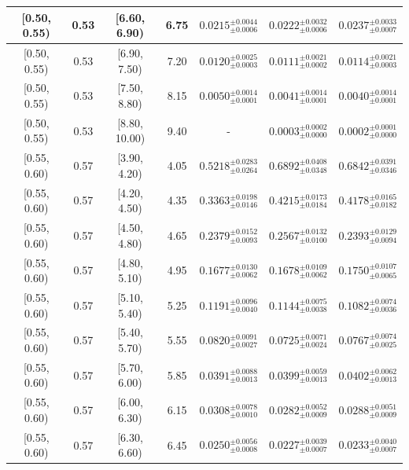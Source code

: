 \begin{longtable}{|c|c|c|c|c|c|c|}
\hline
[0.50, 0.55) & 0.53 & [6.60, 6.90) & 6.75 & $0.0215^{ \pm 0.0044 }_{ \pm 0.0006 }$ & $0.0222^{ \pm 0.0032 }_{ \pm 0.0006 }$ & $0.0237^{ \pm 0.0033 }_{ \pm 0.0007 }$ \\ 
\hline
[0.50, 0.55) & 0.53 & [6.90, 7.50) & 7.20 & $0.0120^{ \pm 0.0025 }_{ \pm 0.0003 }$ & $0.0111^{ \pm 0.0021 }_{ \pm 0.0002 }$ & $0.0114^{ \pm 0.0021 }_{ \pm 0.0003 }$ \\ 
\hline
[0.50, 0.55) & 0.53 & [7.50, 8.80) & 8.15 & $0.0050^{ \pm 0.0014 }_{ \pm 0.0001 }$ & $0.0041^{ \pm 0.0014 }_{ \pm 0.0001 }$ & $0.0040^{ \pm 0.0014 }_{ \pm 0.0001 }$ \\ 
\hline
[0.50, 0.55) & 0.53 & [8.80, 10.00) & 9.40 & - & $0.0003^{ \pm 0.0002 }_{ \pm 0.0000 }$ & $0.0002^{ \pm 0.0001 }_{ \pm 0.0000 }$ \\ 
\hline
[0.55, 0.60) & 0.57 & [3.90, 4.20) & 4.05 & $0.5218^{ \pm 0.0283 }_{ \pm 0.0264 }$ & $0.6892^{ \pm 0.0408 }_{ \pm 0.0348 }$ & $0.6842^{ \pm 0.0391 }_{ \pm 0.0346 }$ \\ 
\hline
[0.55, 0.60) & 0.57 & [4.20, 4.50) & 4.35 & $0.3363^{ \pm 0.0198 }_{ \pm 0.0146 }$ & $0.4215^{ \pm 0.0173 }_{ \pm 0.0184 }$ & $0.4178^{ \pm 0.0165 }_{ \pm 0.0182 }$ \\ 
\hline
[0.55, 0.60) & 0.57 & [4.50, 4.80) & 4.65 & $0.2379^{ \pm 0.0152 }_{ \pm 0.0093 }$ & $0.2567^{ \pm 0.0132 }_{ \pm 0.0100 }$ & $0.2393^{ \pm 0.0129 }_{ \pm 0.0094 }$ \\ 
\hline
[0.55, 0.60) & 0.57 & [4.80, 5.10) & 4.95 & $0.1677^{ \pm 0.0130 }_{ \pm 0.0062 }$ & $0.1678^{ \pm 0.0109 }_{ \pm 0.0062 }$ & $0.1750^{ \pm 0.0107 }_{ \pm 0.0065 }$ \\ 
\hline
[0.55, 0.60) & 0.57 & [5.10, 5.40) & 5.25 & $0.1191^{ \pm 0.0096 }_{ \pm 0.0040 }$ & $0.1144^{ \pm 0.0075 }_{ \pm 0.0038 }$ & $0.1082^{ \pm 0.0074 }_{ \pm 0.0036 }$ \\ 
\hline
[0.55, 0.60) & 0.57 & [5.40, 5.70) & 5.55 & $0.0820^{ \pm 0.0091 }_{ \pm 0.0027 }$ & $0.0725^{ \pm 0.0071 }_{ \pm 0.0024 }$ & $0.0767^{ \pm 0.0074 }_{ \pm 0.0025 }$ \\ 
\hline
[0.55, 0.60) & 0.57 & [5.70, 6.00) & 5.85 & $0.0391^{ \pm 0.0088 }_{ \pm 0.0013 }$ & $0.0399^{ \pm 0.0059 }_{ \pm 0.0013 }$ & $0.0402^{ \pm 0.0062 }_{ \pm 0.0013 }$ \\ 
\hline
[0.55, 0.60) & 0.57 & [6.00, 6.30) & 6.15 & $0.0308^{ \pm 0.0078 }_{ \pm 0.0010 }$ & $0.0282^{ \pm 0.0052 }_{ \pm 0.0009 }$ & $0.0288^{ \pm 0.0051 }_{ \pm 0.0009 }$ \\ 
\hline
[0.55, 0.60) & 0.57 & [6.30, 6.60) & 6.45 & $0.0250^{ \pm 0.0056 }_{ \pm 0.0008 }$ & $0.0227^{ \pm 0.0039 }_{ \pm 0.0007 }$ & $0.0233^{ \pm 0.0040 }_{ \pm 0.0007 }$ \\ 

\end{longtable}
